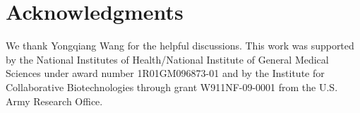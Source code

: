 \documentclass[11pt, letterpaper]{article}
\begin{document}
\section*{Acknowledgments}
We thank Yongqiang Wang for the helpful discussions.
This work was supported by the National Institutes of Health/National Institute of General Medical Sciences under award number 1R01GM096873-01 and by the Institute for Collaborative Biotechnologies through grant W911NF-09-0001 from the U.S.
Army Research Office.




\end{document}

